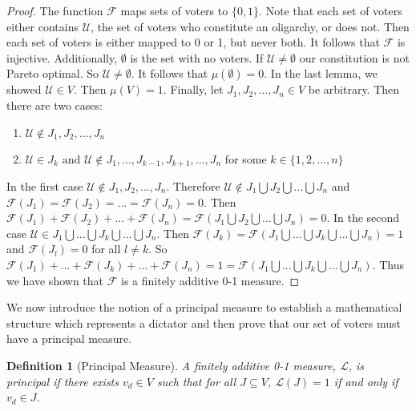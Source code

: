 \documentclass{amsart}
\newtheorem{definition}{Definition}
\theoremstyle{plain}
\begin{document}
\begin{proof}

The function $\mathcal{F}$ maps sets of voters to $\{0,1\}$. Note that each set of voters either contains $\mathcal{U}$, the set of voters who constitute an oligarchy, or does not. Then each set of voters is either mapped to 0 or 1, but never both. It follows that $\mathcal{F}$ is injective. Additionally, $\emptyset$ is the set with no voters. If $\mathcal{U} \ne \emptyset$ our constitution is not Pareto optimal. So $\mathcal{U} \ne \emptyset$. It follows that $\mu(\emptyset) = 0$. In the last lemma, we showed $\mathcal{U} \in V$. Then $\mu(V) = 1$. Finally, let $J_1, J_2, ..., J_n \in V$ be arbitrary. Then there are two cases:

\vskip 0.25cm

\begin{enumerate}
    \item $\mathcal{U} \notin J_1, J_2, ..., J_n$
    \item $\mathcal{U} \in J_k \text{ and } \mathcal{U} \notin J_1, ... , J_{k-1}, J_{k+1}, ... , J_n$ for some $k \in \{1, 2, ... , n\}$
\end{enumerate}

\vskip 0.25cm

\noindent In the first case $\mathcal{U} \notin J_1, J_2, ..., J_n$. Therefore $\mathcal{U} \notin J_1 \bigcup J_2 \bigcup ... \bigcup J_n$ and $\mathcal{F}(J_1) = \mathcal{F}(J_2) = ... = \mathcal{F}(J_n) = 0$. Then $\mathcal{F}(J_1) + \mathcal{F}(J_2) + ... + \mathcal{F}(J_n) = \mathcal{F}(J_1 \bigcup J_2 \bigcup ... \bigcup J_n) = 0$. In the second case $\mathcal{U} \in J_1 \bigcup ... \bigcup J_k \bigcup ... \bigcup J_n$. Then $\mathcal{F}(J_k) = \mathcal{F}(J_1 \bigcup ... \bigcup J_k \bigcup ... \bigcup J_n) = 1$ and $\mathcal{F}(J_l) = 0$ for all $l \ne k$. So $\mathcal{F}(J_1) + ... + \mathcal{F}(J_k) + ... + \mathcal{F}(J_n) = 1 = \mathcal{F}(J_1 \bigcup ... \bigcup J_k \bigcup ... \bigcup J_n)$. Thus we have shown that $\mathcal{F}$ is a finitely additive 0-1 measure.
\end{proof}

We now introduce the notion of a principal measure to establish a mathematical structure which represents a dictator and then prove that our set of voters must have a principal measure.

\begin{definition}[Principal Measure]
    A finitely additive 0-1 measure, $\mathcal{L}$, is principal if there exists $v_d \in V$ such that for all $J \subseteq V$, $\mathcal{L}(J) = 1$ if and only if $v_d \in J$.
\end{definition}
\end{document}
